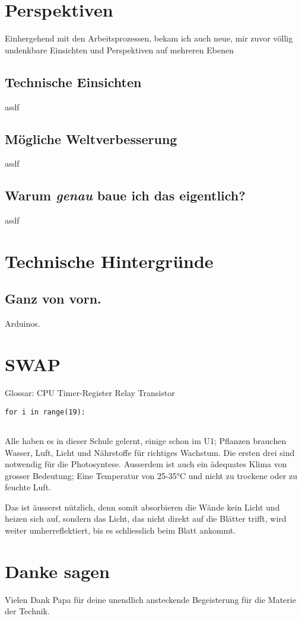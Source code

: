 \documentclass[12pt,titlepage,a4paper]{article}
\begin{document}
\section{Perspektiven}
Einhergehend mit den Arbeitsprozessen, bekam ich auch neue, mir zuvor völlig undenkbare Einsichten und Perspektiven auf mehreren Ebenen
\subsection{Technische Einsichten}
asdf
\subsection{Mögliche Weltverbesserung}
asdf
\subsection{Warum \textit{genau} baue ich das eigentlich?}
asdf


\section{Technische Hintergründe}
\subsection{Ganz von vorn.}
Arduinos.






\printglossary[title=Glossar, toctitle=Glossar]


\section{SWAP}


Glossar:
CPU
Timer-Register
Relay
Transistor

\begin{verbatim}
for i in range(19):
	
\end{verbatim}




Alle haben es in dieser Schule gelernt, einige schon im U1; Pflanzen brauchen Wasser, Luft, Licht und Nährstoffe für richtiges Wachstum. Die ersten drei sind notwendig für die Photosyntese. Ausserdem ist auch ein ädequates Klima von grosser Bedeutung; Eine Temperatur von 25-35°C und nicht zu trockene oder zu feuchte Luft.


Das ist äusserst nützlich, denn somit absorbieren die Wände kein Licht und heizen sich auf, sondern das Licht, das nicht direkt auf die Blätter trifft, wird weiter umherreflektiert, bis es schliesslich beim Blatt ankommt. 



\section{Danke sagen}
Vielen Dank Papa für deine unendlich ansteckende Begeisterung für die Materie der Technik.


%

\end{document}
